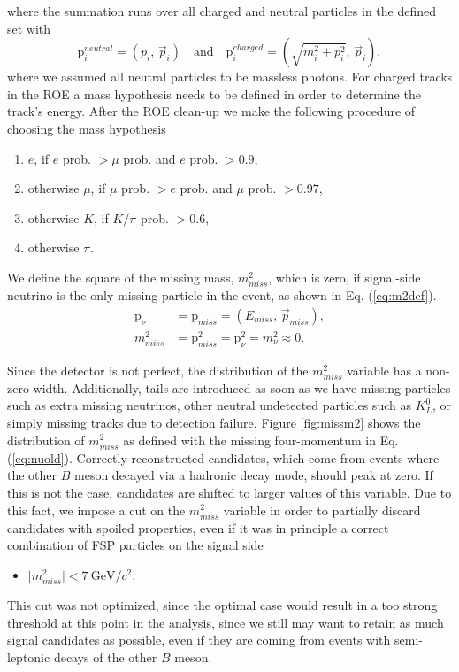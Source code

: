 \documentclass[  headings=standardclasses,
  headings=big,oneside,a4paper,openany,12pt]{scrbook}
\newcommand {\e}[1]{\mathrm{~#1}}
\begin{document}
where the summation runs over all charged and neutral particles in the defined set with
\begin{equation}
\mathrm{p}^{neutral}_i = \left(p_i,\, \vec{p}_i \right) \quad \mathrm{and} \quad \mathrm{p}^{charged}_i = \left(\sqrt{m_i^2 + p_i^2},\, \vec{p}_i \right),
\label{eq:pcharged}
\end{equation}
where we assumed all neutral particles to be massless photons. For charged tracks in the ROE a mass hypothesis needs to be defined in order to determine the track's energy. After the ROE clean-up we make the following procedure of choosing the mass hypothesis
\begin{enumerate}
\item $e$, if $e$ prob. $> \mu$ prob. and $e$ prob. $> 0.9$,
\item otherwise $\mu$, if $\mu$ prob. $> e$ prob. and $\mu$ prob. $> 0.97$,
\item otherwise $K$, if $K/\pi$ prob. $> 0.6$,
\item otherwise $\pi$.
\end{enumerate} 
We define the square of the missing mass, $m_{miss}^2$, which is zero, if signal-side neutrino is the only missing particle in the event, as shown in Eq. (\ref{eq:m2def}).
\begin{align}
\label{eq:nuold}
\mathrm{p}_\nu &= \mathrm{p}_{miss} = \left(E_{miss},\,\vec{p}_{miss} \right),\\
\label{eq:m2def}
m_{miss}^2 &= \mathrm{p}_{miss}^2 = \mathrm{p}_{\nu}^2 = m_\nu^2 \approx 0.
\end{align}

Since the detector is not perfect, the distribution of the $m_{miss}^2$ variable has a non-zero width. Additionally, tails are introduced as soon as we have missing particles such as extra missing neutrinos, other neutral undetected particles such as $K_L^0$, or simply missing tracks due to detection failure. Figure \ref{fig:missm2} shows the distribution of $m_{miss}^2$ as defined with the missing four-momentum in Eq. (\ref{eq:nuold}). Correctly reconstructed candidates, which come from events where the other $B$ meson decayed via a hadronic decay mode, should peak at zero. If this is not the case, candidates are shifted to larger values of this variable. Due to this fact, we impose a cut on the $m_{miss}^2$ variable in order to partially discard candidates with spoiled properties, even if it was in principle a correct combination of FSP particles on the signal side
\begin{itemize}
\item $\vert m_{miss}^2 \vert < 7\e{GeV}/c^2$.
\end{itemize}
This cut was not optimized, since the optimal case would result in a too strong threshold at this point in the analysis, since we still may want to retain as much signal candidates as possible, even if they are coming from events with semi-leptonic decays of the other $B$ meson.
\end{document}
